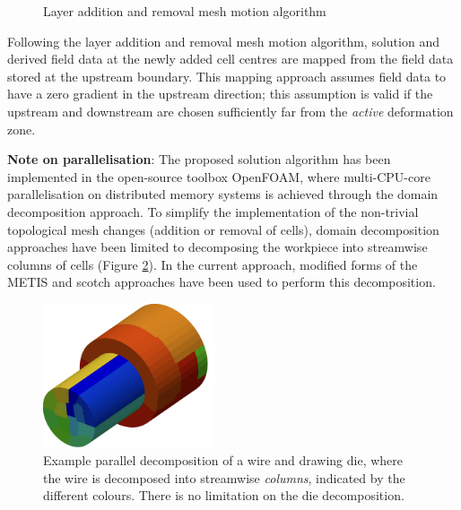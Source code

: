 \documentclass[sn-mathphys,Numbered,draft]{sn-jnl}%
\begin{document}
\begin{figure}[tbh]
	\caption{Layer addition and removal mesh motion algorithm}
	\label{fig:layerAddition}
\end{figure}

Following the layer addition and removal mesh motion algorithm, solution and derived field data at the newly added cell centres are mapped from the field data stored at the upstream boundary.
This mapping approach assumes field data to have a zero gradient in the upstream direction; this assumption is valid if the upstream and downstream are chosen sufficiently far from the \emph{active} deformation zone.

\textbf{Note on parallelisation}: The proposed solution algorithm has been implemented in the open-source toolbox OpenFOAM, where multi-CPU-core parallelisation on distributed memory systems is achieved through the domain decomposition approach.
To simplify the implementation of the non-trivial topological mesh changes (addition or removal of cells), domain decomposition approaches have been limited to decomposing the workpiece into streamwise columns of cells (Figure \ref{fig:layerAdditionParallel}).
In the current approach, modified forms of the METIS \cite{metis} and scotch \cite{scotch} approaches have been used to perform this decomposition.
\begin{figure}[tbh]
	\centering
	\includegraphics[width=0.45\textwidth]{./Figures/layerAddition/parallel}
	\caption{Example parallel decomposition of a wire and drawing die, where the wire is decomposed into streamwise \emph{columns}, indicated by the different colours. There is no limitation on the die decomposition.}
	\label{fig:layerAdditionParallel}
\end{figure}
\end{document}

